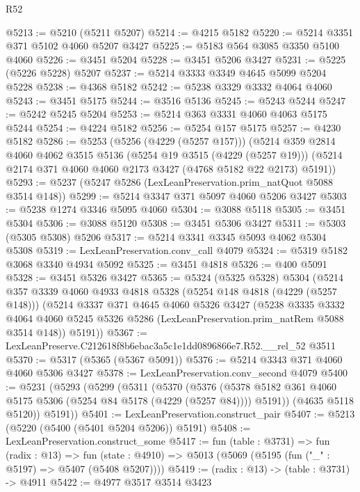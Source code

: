 \begin{lexlean}{R52}
\begin{coremodule}
@5213 := @5210 (@5211 @5207)
@5214 := @4215 @5182
@5220 := @5214 @3351 @371 @5102 @4060 @5207 @3427
@5225 := @5183 @564 @3085 @3350 @5100 @4060
@5226 := @3451 @5204
@5228 := @3451 @5206 @3427
@5231 := @5225 (@5226 @5228) @5207
@5237 := @5214 @3333 @3349 @4645 @5099 @5204 @5228
@5238 := @4368 @5182
@5242 := @5238 @3329 @3332 @4064 @4060
@5243 := @3451 @5175
@5244 := @3516 @5136
@5245 := @5243 @5244
@5247 := @5242 @5245 @5204
@5253 := @5214 @363 @3331 @4060 @4063 @5175 @5244
@5254 := @4224 @5182
@5256 := @5254 @157 @5175
@5257 := @4230 @5182
@5286 := @5253
    (@5256 (@4229 (@5257 @157)))
    (@5214
      @359
      @2814
      @4060
      @4062
      @3515
      @5136
      (@5254 @19 @3515 (@4229 (@5257 @19)))
      (@5214 @2174 @371 @4060 @4060 @2173 @3427 (@4768 @5182 @22 @2173) @5191))
@5293 := @5237 (@5247 @5286 (LexLeanPreservation.prim_natQuot @5088 @3514 @148))
@5299 := @5214 @3347 @371 @5097 @4060 @5206 @3427
@5303 := @5238 @1274 @3346 @5095 @4060
@5304 := @3088 @5118
@5305 := @3451 @5304
@5306 := @3088 @5120
@5308 := @3451 @5306 @3427
@5311 := @5303 (@5305 @5308) @5206
@5317 := @5214 @3341 @3345 @5093 @4062 @5304 @5308
@5319 := LexLeanPreservation.conv_call @4079
@5324 := @5319 @5182 @3068 @3340 @4934 @5092
@5325 := @3451 @4818
@5326 := @400 @5091
@5328 := @3451 @5326 @3427
@5365 := @5324
    (@5325 @5328)
    @5304
    (@5214
      @357
      @3339
      @4060
      @4933
      @4818
      @5328
      (@5254 @148 @4818 (@4229 (@5257 @148)))
      (@5214
        @3337
        @371
        @4645
        @4060
        @5326
        @3427
        (@5238
          @3335
          @3332
          @4064
          @4060
          @5245
          @5326
          @5286
          (LexLeanPreservation.prim_natRem @5088 @3514 @148))
        @5191))
@5367 := LexLeanPreserve.C212618f8b6ebac3a5c1e1dd0896866e7.R52.__rel_52 @3511
@5370 := @5317 (@5365 (@5367 @5091))
@5376 := @5214 @3343 @371 @4060 @4060 @5306 @3427
@5378 := LexLeanPreservation.conv_second @4079
@5400 := @5231
    (@5293
      (@5299
        (@5311
          (@5370
            (@5376
              (@5378 @5182 @361 @4060 @5175 @5306 (@5254 @84 @5178 (@4229 (@5257 @84))))
              @5191))
          (@4635 @5118 @5120))
        @5191))
@5401 := LexLeanPreservation.construct_pair
@5407 := @5213 (@5220 (@5400 (@5401 @5204 @5206)) @5191)
@5408 := LexLeanPreservation.construct_some
@5417 := fun (table : @3731) =>
  fun (radix : @13) =>
  fun (state : @4910) => @5013 (@5069 (@5195 (fun ("_" : @5197) => @5407 (@5408 @5207))))
@5419 := (radix : @13) -> (table : @3731) -> @4911
@5422 := @4977 @3517 @3514 @3423

\end{coremodule}
\end{lexlean}
